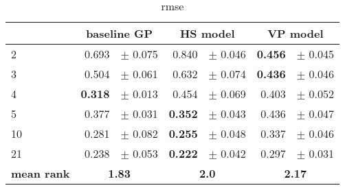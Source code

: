 \begin{table}[] 
 \centering
\begin{tabular}{lrlrlrl}
\hline
 &  \multicolumn{2}{c}{baseline GP}  &  \multicolumn{2}{c}{HS model}  &  \multicolumn{2}{c}{VP model}  \\
\hline
2 & 0.693 & $\pm$ 0.075 & 0.840 & $\pm$ 0.046 & \textbf{0.456} & $\pm$ 0.045 \\
3 & 0.504 & $\pm$ 0.061 & 0.632 & $\pm$ 0.074 & \textbf{0.436} & $\pm$ 0.046 \\
4 & \textbf{0.318} & $\pm$ 0.013 & 0.454 & $\pm$ 0.069 & 0.403 & $\pm$ 0.052 \\
5 & 0.377 & $\pm$ 0.031 & \textbf{0.352} & $\pm$ 0.043 & 0.436 & $\pm$ 0.047 \\
10 & 0.281 & $\pm$ 0.082 & \textbf{0.255} & $\pm$ 0.048 & 0.337 & $\pm$ 0.046 \\
21 & 0.238 & $\pm$ 0.053 & \textbf{0.222} & $\pm$ 0.042 & 0.297 & $\pm$ 0.031 \\
\hline
\textbf{mean rank} & \multicolumn{2}{c}{\textbf{1.83}} & \multicolumn{2}{c}{\textbf{2.0}} & \multicolumn{2}{c}{\textbf{2.17}}\\
\hline
\end{tabular}
\caption{rmse}
\label{tab:rmse}
\end{table}
